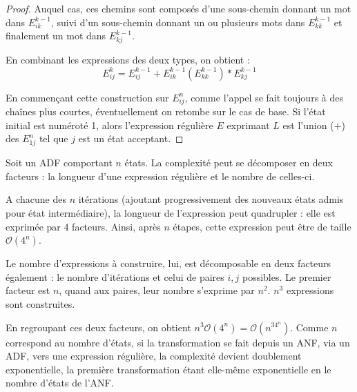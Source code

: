 \begin{proof}
	Auquel cas, ces chemins sont composés d'une sous-chemin donnant un mot dans $E_{ik}^{k-1}$, suivi d'un sous-chemin donnant un ou plusieurs mots dans $E_{kk}^{k-1}$ et finalement un mot dans $E_{kj}^{k-1}$.
	
	En combinant les expressions des deux types, on obtient :
	$$
	E_{ij}^k = E_{ij}^{k-1}+E_{ik}^{k-1}(E_{kk}^{k-1})*E_{kj}^{k-1}
	$$
	
	En commençant cette construction sur $E_{ij}^n$, comme l'appel se fait toujours à des chaînes plus courtes, éventuellement on retombe sur le cas de base. Si l'état initial est numéroté 1, alors l'expression régulière $E$ exprimant $L$ est l'union ($+$) des $E_{1j}^n$ tel que $j$ est un état acceptant.
\end{proof}

\begin{complexity}
	Soit un ADF \automaton comportant $n$ états. La complexité peut se décomposer en deux facteurs : la longueur d'une expression régulière et le nombre de celles-ci.
	
	A chacune des $n$ itérations (ajoutant progressivement des nouveaux états admis pour état intermédiaire), la longueur de l'expression peut quadrupler : elle est exprimée par 4 facteurs. Ainsi, après $n$ étapes, cette expression peut être de taille $\mathcal{O}(4^n)$.
	
	Le nombre d'expressions à construire, lui, est décomposable en deux facteurs également : le nombre d'itérations et celui de paires $i,j$ possibles. Le premier facteur est $n$, quand aux paires, leur nombre s'exprime par $n^2$. $n^3$ expressions sont construites.
	
	En regroupant ces deux facteurs, on obtient $n^3\mathcal{O}(4^n)=\mathcal{O}(n^34^n)$. Comme $n$ correspond au nombre d'états, si la transformation se fait depuis un ANF, via un ADF, vers une expression régulière, la complexité devient doublement exponentielle, la première transformation étant elle-même exponentielle en le nombre d'états de l'ANF.	
\end{complexity}


